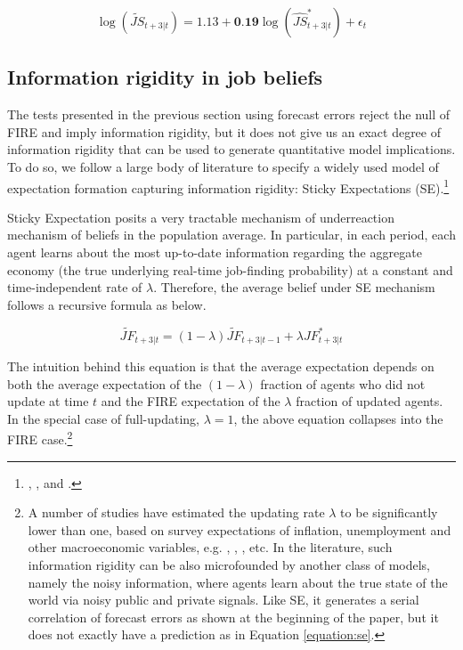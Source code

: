 \begin{equation}
\label{eq:js_est}
 \log(\widetilde {{JS}}_{t+3|t}) = 1.13 + \textbf{0.19} \log(\widehat {JS}^*_{t+3|t}) + \epsilon_{t}
\end{equation}


\subsection{Information rigidity in job beliefs}

The tests presented in the previous section using forecast errors reject the null of FIRE and imply information rigidity, but it does not give us an exact degree of information rigidity that can be used to generate quantitative model implications. To do so, we follow a large body of literature to specify a widely used model of expectation formation capturing information rigidity: Sticky Expectations (SE).\footnote{\cite{mankiw2002sticky}, \cite{carroll2003macroeconomic}, and  \cite{coibion2015information}.}

Sticky Expectation posits a very tractable mechanism of underreaction mechanism of beliefs in the population average. In particular, in each period, each agent learns about the most up-to-date information regarding the aggregate economy (the true underlying real-time job-finding probability) at a constant and time-independent rate of $\lambda$. Therefore, the average belief under SE mechanism follows a recursive formula as below. 

\begin{equation}
\label{equation:se}
\widetilde {JF}_{t+3|t} = (1-\lambda) \widetilde {JF}_{t+3|t-1} + \lambda {JF}^*_{t+3|t} 
\end{equation}

The intuition behind this equation is that the average expectation depends on both the average expectation of the $(1-\lambda)$ fraction of agents who did not update at time $t$ and the FIRE expectation of the $\lambda$ fraction of updated agents. In the special case of full-updating, $\lambda = 1$, the above equation collapses into the FIRE case.\footnote{A number of studies have estimated the updating rate $\lambda$ to be significantly lower than one, based on survey expectations of inflation, unemployment and other macroeconomic variables, e.g. \citet{mankiw2002sticky}, \citet{carroll2003macroeconomic}, \cite{coibion2012can}, etc. In the literature, such information rigidity can be also microfounded by another class of models, namely the noisy information, where agents learn about the true state of the world via noisy public and private signals. Like SE, it generates a serial correlation of forecast errors as shown at the beginning of the paper, but it does not exactly have a prediction as in Equation \ref{equation:se}. }

